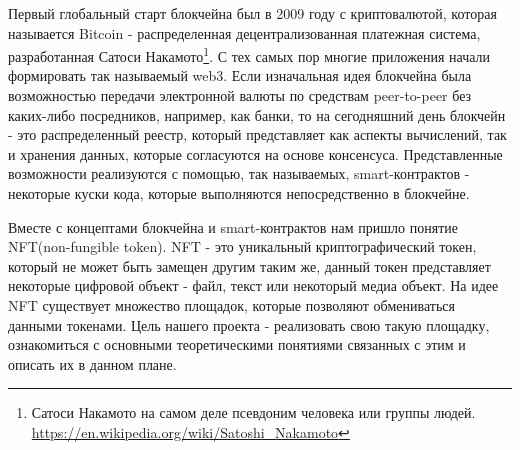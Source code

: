 
Первый глобальный старт блокчейна был в 2009 году с криптовалютой, которая называется Bitcoin - распределенная децентрализованная платежная система, разработанная Сатоси Накамото\footnote{Сатоси Накамото на самом деле псевдоним человека или группы людей. \url{https://en.wikipedia.org/wiki/Satoshi_Nakamoto}}. С тех самых пор многие приложения начали формировать так называемый web3. Если изначальная идея блокчейна была возможностью передачи электронной валюты по средствам peer-to-peer без каких-либо посредников, например, как банки, то на сегодняшний день блокчейн - это распределенный реестр, который представляет как аспекты вычислений, так и хранения данных, которые согласуются на основе консенсуса. Представленные возможности реализуются с помощью, так называемых, smart-контрактов - некоторые куски кода, которые выполняются непосредственно в блокчейне.

Вместе с концептами блокчейна и smart-контрактов нам пришло понятие NFT(non-fungible token). NFT - это уникальный криптографический токен, который не может быть замещен другим таким же, данный токен представляет некоторые цифровой объект - файл, текст или некоторый медиа объект. На идее NFT существует множество площадок, которые позволяют обмениваться данными токенами. Цель нашего проекта - реализовать свою такую площадку, ознакомиться с основными теоретическими понятиями связанных с этим и описать их в данном плане.